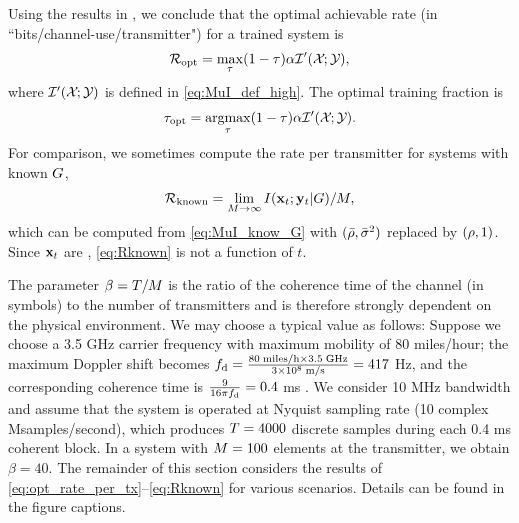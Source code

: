 \documentclass[12pt, draftclsnofoot,journal,onecolumn]{IEEEtran}
\begin{document}
Using the results in \cite{gaopart1}, we conclude that the optimal achievable rate (in ``bits/channel-use/transmitter") for a trained system is
\begin{align}
    \mathcal{R}_{\rm opt}=\max_{\tau} (1-\tau)\alpha\mathcal{I}{'}({\mathcal{X}}_{};{\mathcal{Y}}_{}),
    \label{eq:opt_rate_per_tx}
\end{align}
where $\mathcal{I}{'}({\mathcal{X}}_{};{\mathcal{Y}}_{})$ is defined in \eqref{eq:MuI_def_high}. 
The optimal training fraction is
\begin{align}
    \tau_{{\rm opt}}=\mathop{\mathrm{argmax}}_{\tau}(1-\tau)\alpha\mathcal{I}{'}({\mathcal{X}}_{};{\mathcal{Y}}_{}).
    \label{eq:tau_opt_value}
\end{align}
For comparison, we sometimes compute the rate per transmitter for systems with known $G$, %
\begin{align}
    \mathcal{R}_{\rm known}=\lim_{M\to\infty}I({\mathbf{x}}_t;{\mathbf{y}}_t|G)/{M},
    \label{eq:Rknown}
\end{align}
which can be computed from \eqref{eq:MuI_know_G} with $(\bar{\rho},\bar{\sigma}_{}^2)$ replaced by $(\rho,1)$. Since ${\mathbf{x}}_t$ are \iid, \eqref{eq:Rknown} is not a function of $t$.  

The parameter $\beta=T/M$ is the ratio of the coherence time of the channel (in symbols) to the number of transmitters and is therefore strongly dependent on the physical environment.  We may choose a typical value as follows: Suppose we choose a 3.5 GHz carrier frequency with maximum mobility of 80 miles/hour; the maximum Doppler shift becomes $f_{\rm d}=\frac{80\; \text{miles/h}\times 3.5\; \text{GHz}}{3\times 10^8\; \text{m/s}}=417$ Hz, and the corresponding coherence time is  $\frac{9}{16\pi f_{\rm d}}=0.4$ ms \cite{rappaport1996wireless}. We consider 10 MHz bandwidth and assume that the system is operated at Nyquist sampling rate (10 complex Msamples/second), which produces $T=4000$ discrete samples during each 0.4 ms coherent block. In a system with $M=100$ elements at the transmitter, we obtain $\beta=40$.  The remainder of this section considers the results of \eqref{eq:opt_rate_per_tx}--\eqref{eq:Rknown} for various scenarios.  Details can be found in the figure captions.
\end{document}
